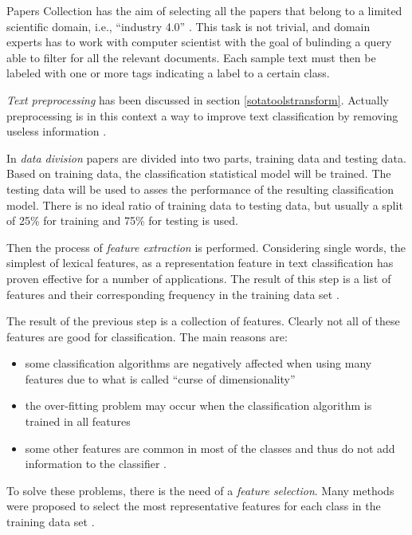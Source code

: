 \documentclass[]{book}
\begin{document}
Papers Collection has the aim of selecting all the papers that belong to
a limited scientific domain, i.e., ``industry 4.0''
\citep{weiss2015fundamentals, chiarello2018extracting}. This task is not
trivial, and domain experts has to work with computer scientist with the
goal of bulinding a query able to filter for all the relevant documents.
Each sample text must then be labeled with one or more tags indicating a
label to a certain class.

\emph{Text preprocessing} has been discussed in section
\ref{sotatoolstransform}. Actually preprocessing is in this context a
way to improve text classification by removing useless information
\citep[\citet{meyer2008text}]{weiss2010text}.

In \emph{data division} papers are divided into two parts, training data
and testing data. Based on training data, the classification statistical
model will be trained. The testing data will be used to asses the
performance of the resulting classification model. There is no ideal
ratio of training data to testing data, but usually a split of 25\% for
training and 75\% for testing is used.

Then the process of \emph{feature extraction} is performed. Considering
single words, the simplest of lexical features, as a representation
feature in text classification has proven effective for a number of
applications. The result of this step is a list of features and their
corresponding frequency in the training data set \citep{weiss2010text}.

The result of the previous step is a collection of features. Clearly not
all of these features are good for classification. The main reasons are:

\begin{itemize}
\item
  some classification algorithms are negatively affected when using many
  features due to what is called ``curse of dimensionality''
\item
  the over-fitting problem may occur when the classification algorithm
  is trained in all features
\item
  some other features are common in most of the classes and thus do not
  add information to the classifier .
\end{itemize}

To solve these problems, there is the need of a \emph{feature
selection}. Many methods were proposed to select the most representative
features for each class in the training data set
\citep{zhao2012r, weiss2010text, weiss2015fundamentals}.
\end{document}
